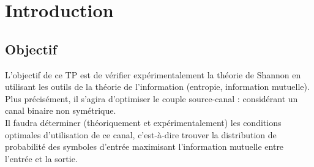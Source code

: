 \documentclass{report}
\begin{document}
\chapter{Introduction}
\section{Objectif}

L’objectif de ce TP est de vérifier expérimentalement la théorie de Shannon en utilisant les
outils de la théorie de l’information (entropie, information mutuelle).\\ Plus précisément, il
s’agira d’optimiser le couple source-canal : considérant un canal binaire non symétrique.\\ Il
faudra déterminer (théoriquement et expérimentalement) les conditions optimales d’utilisation
de ce canal, c’est-à-dire trouver la distribution de probabilité des symboles d’entrée maximisant
l’information mutuelle entre l’entrée et la sortie.
\end{document}
